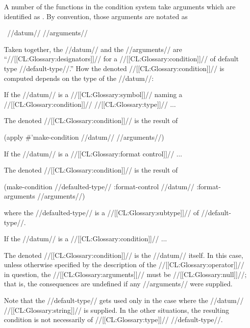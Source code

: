 A number of the functions in the condition system take arguments which
are identified as .
By convention, those arguments are notated as

\ //datum// {\rest} //arguments//

Taken together, the //datum// and the //arguments// are 
``//[[CL:Glossary:designators]]// for a //[[CL:Glossary:condition]]// of default type //default-type//.''
How the denoted //[[CL:Glossary:condition]]// is computed depends on the type of the //datum//:

\beginlist

\item{{\bull} If the //datum// is a //[[CL:Glossary:symbol]]// 
              naming a //[[CL:Glossary:condition]]// //[[CL:Glossary:type]]// $\ldots$}

The denoted //[[CL:Glossary:condition]]// is the result of

\code
 (apply #'make-condition //datum// //arguments//)
\endcode

\item{{\bull} If the //datum// is a //[[CL:Glossary:format control]]// $\ldots$}


The denoted //[[CL:Glossary:condition]]// is the result of 

\code
 (make-condition //defaulted-type// 
                 :format-control //datum//
                 :format-arguments //arguments//)
\endcode






where the //defaulted-type// is a //[[CL:Glossary:subtype]]// of //default-type//.

\item{{\bull} If the //datum// is a //[[CL:Glossary:condition]]// $\ldots$}

The denoted //[[CL:Glossary:condition]]// is the //datum// itself.
In this case, unless otherwise specified by the description of the
//[[CL:Glossary:operator]]// in question, the //[[CL:Glossary:arguments]]// must be //[[CL:Glossary:null]]//;
that is, the consequences are undefined if any //arguments// were supplied. 

\endlist

Note that the //default-type// gets used only in the case where
the //datum// //[[CL:Glossary:string]]// is supplied.  In the other situations,
the resulting condition is not necessarily of //[[CL:Glossary:type]]// //default-type//.

